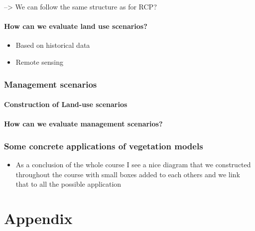 \documentclass[
  oneside]{book}
\providecommand{\tightlist}{%
  \setlength{\itemsep}{0pt}\setlength{\parskip}{0pt}}
\begin{document}
--\textgreater{} We can follow the same structure as for RCP?

\hypertarget{how-can-we-evaluate-land-use-scenarios}{%
\subsection{How can we evaluate land use scenarios?}\label{how-can-we-evaluate-land-use-scenarios}}

\begin{itemize}
\tightlist
\item
  Based on historical data
\item
  Remote sensing
\end{itemize}

\hypertarget{management-scenarios}{%
\section{Management scenarios}\label{management-scenarios}}

\hypertarget{construction-of-land-use-scenarios-1}{%
\subsection{Construction of Land-use scenarios}\label{construction-of-land-use-scenarios-1}}

\hypertarget{how-can-we-evaluate-management-scenarios}{%
\subsection{How can we evaluate management scenarios?}\label{how-can-we-evaluate-management-scenarios}}

\hypertarget{some-concrete-applications-of-vegetation-models}{%
\section{Some concrete applications of vegetation models}\label{some-concrete-applications-of-vegetation-models}}

\begin{itemize}
\tightlist
\item
  As a conclusion of the whole course I see a nice diagram that we constructed throughout the course with small boxes added to each others and we link that to all the possible application
\end{itemize}

\hypertarget{part-appendix}{%
\part{Appendix}\label{part-appendix}}
\end{document}
